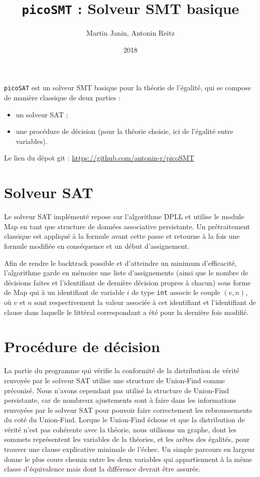 \documentclass[a4paper, 11pt, twoside]{article}
\title{\texttt{picoSMT} : Solveur SMT basique}
\author{Martin Janin, Antonin Reitz}
\date{2018}
\begin{document}
\maketitle

\texttt{picoSAT} est un solveur SMT basique pour la théorie de l'égalité, qui se compose de manière classique de deux parties :
\begin{itemize}
\item un solveur SAT ;
\item une procédure de décision (pour la théorie choisie, ici de l'égalité entre variables).
\end{itemize}
Le lien du dépot git :
\url{https://github.com/antonin-r/picoSMT}

\section{Solveur SAT}

Le solveur SAT implémenté repose sur l'algorithme DPLL et utilise le module Map en tant que structure de données associative persistante. Un prétraitement classique est appliqué à la formule avant cette passe et retourne à la fois une formule modifiée en conséquence et un début d'assignement.

Afin de rendre le backtrack possible et d'atteindre un minimum d'efficacité, l'algorithme garde en mémoire une liste d'assignements (ainsi que le nombre de décisions faites et l'identifiant de dernière décision propres à chacun) sous forme de Map qui à un identifiant de variable $i$ de type \texttt{int} associe le couple $(v, n)$, où $v$ et $n$ sont respectivement la valeur associée à cet identifiant et l'identifiant de clause dans laquelle le littéral correspondant a été pour la dernière fois modifié.

\section{Procédure de décision}

La partie du programme qui vérifie la conformité de la distribution de vérité
renvoyée par le solveur SAT utilise une structure de Union-Find comme préconisé.
Nous n'avons cependant pas utilisé la structure de Union-Find persistante, car
de nombreux ajustements sont à faire dans les informations renvoyées par le
solveur SAT pour pouvoir faire correctement les rebroussements du coté du
Union-Find.
Lorque le Union-Find échoue et que la distribution de vérité n'est pas cohérente
avec la théorie, nous utilisons un graphe, dont les sommets représentent les 
variables de la théories, et les arêtes des égalités, pour trouver une clause
explicative minimale de l'échec. Un simple parcours en largeur donne le plus
cours chemin entre les deux variables qui appartiennent à la même classe
d'équivalence mais dont la différence devrait être assurée.
\end{document}
